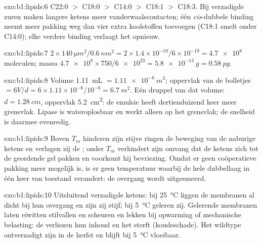 \begin{solution}{exo:b1:lipids:6}
C22:0 $>$ C18:0 $>$ C14:0 $>$ C18:1 $>$ C18:3. Bij verzadigde zuren maken langere
ketens meer vanderwaalscontacten; één \emph{cis}-dubbele binding neemt meer
pakking weg dan vier extra koolstoffen toevoegen (C18:1 smelt onder C14:0); elke
verdere binding verlaagt het opnieuw.
\end{solution}

\begin{solution}{exo:b1:lipids:7}
$2\times\qty{140}{\micro m^2}/\qty{0.6}{nm^2} = 2\times 1.4\times
10^{-10}/6\times 10^{-19} = \num{4.7e8}$ moleculen; massa
$\num{4.7e8}\times 750/\num{6e23} = \qty{5.8e-13}{g} = \qty{0.58}{pg}$.
\end{solution}

\begin{solution}{exo:b1:lipids:8}
Volume \qty{1.11}{mL} $= \qty{1.11e-6}{m^3}$; oppervlak van de bolletjes
$= 6V/d = 6\times 1.11\times 10^{-6}/10^{-6} = \qty{6.7}{m^2}$. Eén druppel van
dat volume: $d = \qty{1.28}{cm}$, oppervlak \qty{5.2}{cm^2}: de emulsie heeft
dertienduizend keer meer grensvlak. Lipase is wateroplosbaar en werkt alleen op
het grensvlak; de snelheid is daarmee evenredig.
\end{solution}

\begin{solution}{exo:b1:lipids:9}
Boven $T_m$ hinderen zijn stijve ringen de beweging van de naburige ketens en
verlagen zij de ; onder $T_m$ verhindert zijn omvang dat de ketens
zich tot de geordende gel pakken en voorkomt hij bevriezing. Omdat er geen
coöperatieve pakking meer mogelijk is, is er geen temperatuur waarbij de hele
dubbellaag in één keer van toestand verandert: de overgang wordt uitgesmeerd.
\end{solution}

\begin{solution}{exo:b1:lipids:10}
Uitsluitend verzadigde ketens: bij \qty{25}{\celsius} liggen de membranen al dicht
bij hun overgang en zijn zij stijf; bij \qty{5}{\celsius} geleren zij. Gelerende
membranen laten eiwitten stilvallen en scheuren en lekken bij opwarming of
mechanische belasting: de  verliezen hun inhoud en het  sterft
(koudeschade). Het wildtype ontverzadigt zijn  in de herfst en blijft bij
\qty{5}{\celsius} vloeibaar.
\end{solution}

